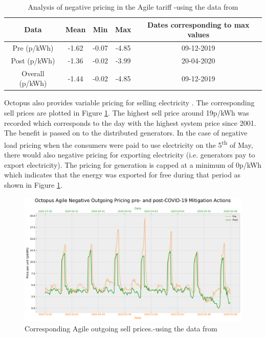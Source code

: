 \documentclass[energies,article,submit,moreauthors,pdftex]{Definitions/mdpi}
\begin{document}
\begin{table}[H]
\caption{Analysis of negative pricing in the  Agile tariff -using the data from \cite{HomeUK}}\label{table:neg_agile_table}
\centering
\begin{tabular}{ccccc }
\toprule
\textbf{Data} & \textbf{Mean}	& \textbf{Min}	& \textbf{Max}& Dates corresponding to max values\\
\midrule
Pre	(p/kWh)	& -1.62			& -0.07         & -4.85 &09-12-2019\\
Post (p/kWh) & -1.36			& -0.02         & -3.99& 20-04-2020\\
Overall (p/kWh) & -1.44			& -0.02         & -4.85 &09-12-2019\\
\bottomrule
\end{tabular}
\end{table}

Octopus also provides variable pricing for selling electricity \cite{AgileEnergy}. The corresponding sell prices are plotted in Figure \ref{fig:agile_OUT}. The highest sell price around 19p/kWh was recorded which corresponds to the day with the highest system price since 2001. The benefit is passed on to the distributed generators. In the case of negative load pricing when the consumers were paid to use electricity on the 5\textsuperscript{th} of May, there would also negative pricing for exporting electricity (i.e. generators pay to export electricity). The pricing for generation is capped at a minimum of 0p/kWh which indicates that the energy was exported for free during that period as shown in Figure \ref{fig:agile_OUT}.

\begin{figure}[H]\centering
\hspace{-25pt}\includegraphics[trim={0 0 0 1.5cm}, clip, width=15 cm]{Graphics/Pre-post_AgileOUTGO_negative_comp.pdf}
\caption{Corresponding Agile outgoing sell prices.-using the data from \cite{HomeUK}}\label{fig:agile_OUT}
\end{figure}  
\end{document}
